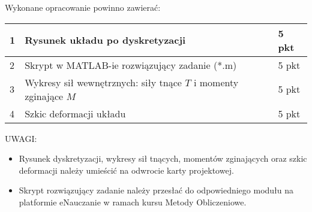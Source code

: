 \documentclass[a4paper,10pt]{article}
\begin{document}
    \vspace{10mm}
    Wykonane opracowanie powinno zawierać:

    \begin{table}[ht]
    \centering
    \begin{tabular}{m{}m{}m{}}
    \toprule
    1 & Rysunek układu po dyskretyzacji & 5 pkt \\ \midrule
    2 & Skrypt w MATLAB-ie rozwiązujący zadanie (*.m) & 5 pkt \\ \midrule
    3 & Wykresy sił wewnętrznych: siły tnące \(T\) i momenty zginające \(M\) & 5 pkt \\ \midrule
    4 & Szkic deformacji układu & 5 pkt \\ \bottomrule
    \end{tabular}
    \label{tab:punktacja}
    \end{table}

    \vspace{5mm}
    UWAGI:
    \begin{itemize}
        \item Rysunek dyskretyzacji, wykresy sił tnących, momentów zginających oraz szkic deformacji należy umieścić na odwrocie karty projektowej.
        \item Skrypt rozwiązujący zadanie należy przesłać do odpowiedniego modułu na platformie eNauczanie w ramach kursu Metody Obliczeniowe.
    \end{itemize}
\end{document}
